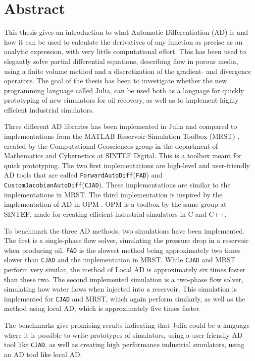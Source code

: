 \chapter*{Abstract}
This thesis gives an introduction to what Automatic Differentiation (AD) is and how it can be used to calculate the derivatives of any function as precise as an analytic expression, with very little computational effort. This has been used to elegantly solve partial differential equations, describing flow in porous media, using a finite volume method and a discretization of the gradient- and divergence operators. The goal of the thesis has been to investigate whether the new programming language called Julia, can be used both as a language for quickly prototyping of new simulators for oil recovery, as well as to implement highly efficient industrial simulators.

Three different AD libraries has been implemented in Julia and compared to implementations from the MATLAB Reservoir Simulation Toolbox (MRST) \emph{\citep{mrstHomepage}}, created by the Computational Geosciences  group  in  the  department  of  Mathematics  and  Cybernetics  at  SINTEF Digital. This is a toolbox meant for quick prototyping. The two first implementations are high-level and user-friendly AD tools that are called \texttt{ForwardAutoDiff}(\texttt{FAD}) and \texttt{CustomJacobianAutoDiff}(\texttt{CJAD}). These implementations are similar to the implementations in MRST. The third implementation is inspired by the implementation of AD in OPM \emph{\citep{opm}}. OPM is a toolbox by the same group at SINTEF, made for creating efficient industrial simulators in C and C++. 

To benchmark the three AD methods, two simulations have been implemented. The first is a single-phase flow solver, simulating the pressure drop in a reservoir when producing oil. \texttt{FAD} is the slowest method being approximately two times slower than \texttt{CJAD} and the implementation in MRST. While \texttt{CJAD} and MRST perform very similar, the method of Local AD is approximately six times faster than these two. The second implemented simulation is a two-phase flow solver, simulating how water flows when injected into a reservoir. This simulation is implemented for \texttt{CJAD} and MRST, which again perform similarly, as well as the method using local AD, which is approximately five times faster.

The benchmarks give promising results indicating that Julia could be a language where it is possible to write prototypes of simulators, using a user-friendly AD tool like \texttt{CJAD}, as well as creating high performance industrial simulators, using an AD tool like local AD.
